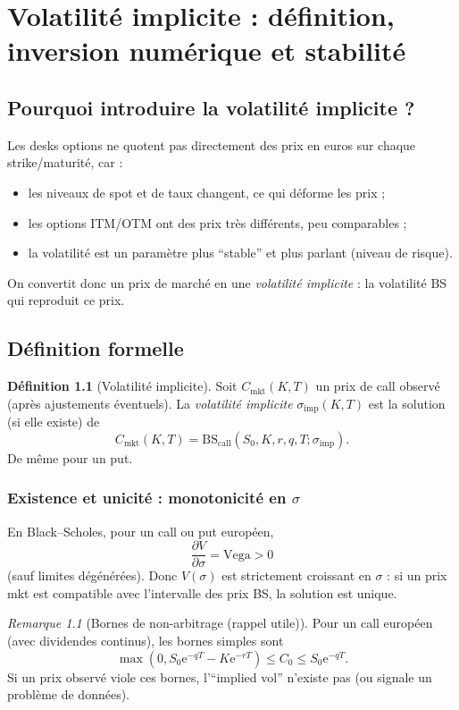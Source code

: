 \documentclass[11pt,a4paper]{report}
\newcommand{\ee}{\mathrm{e}}
\newcommand{\1}{\mathbbm{1}}
\newcommand{\pd}[2]{\frac{\partial #1}{\partial #2}}
\newcommand{\BS}{\mathrm{BS}}
\newcommand{\vega}{\mathrm{Vega}}
\theoremstyle{definition}
\newtheorem{definition}{Définition}[chapter]
\theoremstyle{plain}
\theoremstyle{remark}
\newtheorem{remark}{Remarque}[chapter]
\begin{document}
\chapter{Volatilité implicite : définition, inversion numérique et stabilité}
\label{chap:implied_vol}

\section{Pourquoi introduire la volatilité implicite ?}
Les desks options ne quotent pas directement des prix en euros sur chaque strike/maturité,
car :
\begin{itemize}
  \item les niveaux de spot et de taux changent, ce qui déforme les prix ;
  \item les options ITM/OTM ont des prix très différents, peu comparables ;
  \item la volatilité est un paramètre plus ``stable'' et plus parlant (niveau de risque).
\end{itemize}
On convertit donc un prix de marché en une \emph{volatilité implicite} : la volatilité BS qui reproduit ce prix.

\section{Définition formelle}
\begin{definition}[Volatilité implicite]
Soit $C_{\mathrm{mkt}}(K,T)$ un prix de call observé (après ajustements éventuels).
La \emph{volatilité implicite} $\sigma_{\mathrm{imp}}(K,T)$ est la solution (si elle existe) de
\[
C_{\mathrm{mkt}}(K,T) = \BS_{\mathrm{call}}(S_0,K,r,q,T;\sigma_{\mathrm{imp}}).
\]
De même pour un put.
\end{definition}

\subsection{Existence et unicité : monotonicité en $\sigma$}
En Black--Scholes, pour un call ou put européen,
\[
\pd{V}{\sigma} = \vega > 0
\]
(sauf limites dégénérées).
Donc $V(\sigma)$ est strictement croissant en $\sigma$ : si un prix mkt est compatible avec l'intervalle des prix BS, la solution est unique.

\begin{remark}[Bornes de non-arbitrage (rappel utile)]
Pour un call européen (avec dividendes continus), les bornes simples sont
\[
\max(0, S_0\ee^{-qT}-K\ee^{-rT}) \le C_0 \le S_0\ee^{-qT}.
\]
Si un prix observé viole ces bornes, l'``implied vol'' n'existe pas (ou signale un problème de données).
\end{remark}
\end{document}
